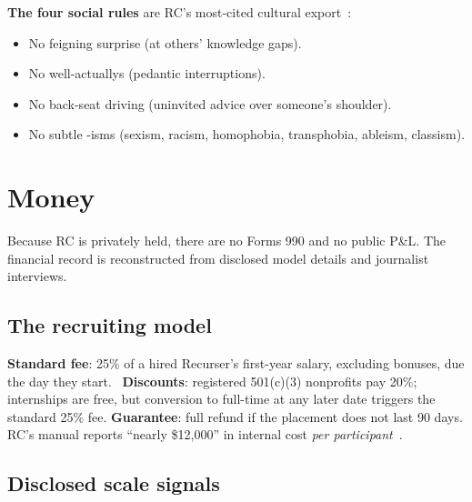 \documentclass[10pt,letterpaper,twocolumn]{article}
\begin{document}
\textbf{The four social rules} are RC's most-cited cultural export~\citep{rcmanual}:
\begin{itemize}
\item No feigning surprise (at others' knowledge gaps).
\item No well-actuallys (pedantic interruptions).
\item No back-seat driving (uninvited advice over someone's shoulder).
\item No subtle -isms (sexism, racism, homophobia, transphobia, ableism, classism).
\end{itemize}

\section{Money}

Because RC is privately held, there are no Forms 990 and no public P\&L. The financial record is reconstructed from disclosed model details and journalist interviews.

\subsection{The recruiting model}

\textbf{Standard fee}: 25\% of a hired Recurser's first-year salary, excluding bonuses, due the day they start.~\citep{rchirepage} \textbf{Discounts}: registered 501(c)(3) nonprofits pay 20\%; internships are free, but conversion to full-time at any later date triggers the standard 25\% fee. \textbf{Guarantee}: full refund if the placement does not last 90 days. RC's manual reports ``nearly \$12,000'' in internal cost \emph{per participant}~\citep{wikipediarc}.

\subsection{Disclosed scale signals}

\begin{table}[h]
\small
\centering
\end{table}
\end{document}
